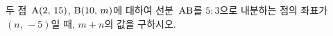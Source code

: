 두 점~$\mathrm{A}(2,\,15)$, $\mathrm{B}(10,\,m)$에 대하여 선분~$\mathrm{AB}$를 $5:3$으로 내분하는 점의 좌표가 $(n,\,-5)$일 때, $m+n$의 값을 구하시오.
